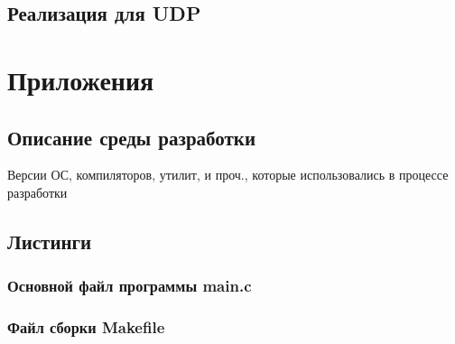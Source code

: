 \documentclass[12pt,a4paper]{report}
\begin{document}
\section{Реализация для UDP}

\chapter*{Приложения}
\section*{Описание среды разработки}
Версии ОС, компиляторов, утилит, и проч., которые использовались в процессе разработки
\section*{Листинги}
\subsection*{Основной файл программы main.c}

\subsection*{Файл сборки Makefile}

\end{document}
